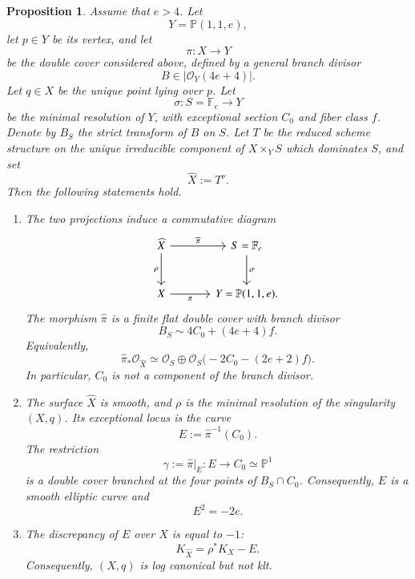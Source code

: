 \documentclass[11pt,twoside]{amsart}
\theoremstyle{plain}
\numberwithin{equation}{section}
\newtheorem{proposition}[theorem]{Proposition}
\theoremstyle{definition}
\begin{document}
\begin{proposition}\label{prop:resolution-of-cover}
Assume that $e>4$. Let
\[
Y=\mathbb P(1,1,e),
\]
let $p\in Y$ be its vertex, and let
\[
\pi:X\longrightarrow Y
\]
be the double cover considered above, defined by a general branch divisor
\[
B\in\left|\mathcal O_Y(4e+4)\right|.
\]
Let $q\in X$ be the unique point lying over $p$. Let
\[
\sigma:S=\mathbb F_e\longrightarrow Y
\]
be the minimal resolution of $Y$, with exceptional section $C_0$ and fiber class $f$. Denote by $B_S$ the strict transform of $B$ on $S$. Let $T$ be the reduced scheme structure on the unique irreducible component of
$X\times_Y S$ which dominates $S$, and set
\[
\widehat X:=T^\nu.
\]
Then the following statements hold.

\begin{enumerate}
    \item The two projections induce a commutative diagram
    \[
    \begin{tikzcd}[column sep=large,row sep=large]
        \widehat X
        \arrow[r,"\widehat\pi"]
        \arrow[d,"\rho"']
        &
        S=\mathbb F_e
        \arrow[d,"\sigma"]
        \\
        X
        \arrow[r,"\pi"']
        &
        Y=\mathbb P(1,1,e).
    \end{tikzcd}
    \]
    The morphism $\widehat\pi$ is a finite flat double cover with branch divisor
    \[
    B_S\sim 4C_0+(4e+4)f.
    \]
    Equivalently,
    \[
    \widehat\pi_*\mathcal O_{\widehat X}
    \simeq
    \mathcal O_S
    \oplus
    \mathcal O_S\bigl(-2C_0-(2e+2)f\bigr).
    \]
    In particular, $C_0$ is not a component of the branch divisor.

    \item The surface $\widehat X$ is smooth, and $\rho$ is the minimal resolution of the singularity $(X,q)$. Its exceptional locus is the curve
    \[
    E:=\widehat\pi^{-1}(C_0).
    \]
    The restriction
    \[
    \gamma:=\widehat\pi|_E:E\longrightarrow C_0\simeq\mathbb P^1
    \]
    is a double cover branched at the four points of $B_S\cap C_0$. Consequently, $E$ is a smooth elliptic curve and
    \[
    E^2=-2e.
    \]

    \item The discrepancy of $E$ over $X$ is equal to $-1$:
    \[
    K_{\widehat X}=\rho^*K_X-E.
    \]
    Consequently, $(X,q)$ is log canonical but not klt.


\end{enumerate}
\end{proposition}
\end{document}
